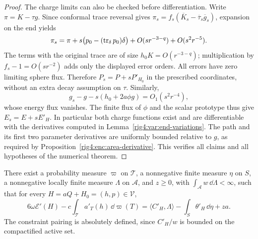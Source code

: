 \begin{proof}
The charge limits can also be checked before differentiation. Write
$\pi=K-\tau g$. Since conformal trace reversal gives
$\pi_s=f_s(\overline K_s-\overline\tau_s\overline g_s)$, expansion on the
end yields
\[
 \pi_s=\pi+s\bigl(p_0-(\operatorname{tr}_\delta p_0)\delta\bigr)
          +O(sr^{-3-q})+O(s^2r^{-5}).
\]
The terms with the original trace are of size
$h_0K=O(r^{-3-q})$; multiplication by $f_s-1=O(sr^{-2})$ adds only the
displayed error orders. All errors have zero limiting sphere flux.
Therefore $P_s=P+sP'_{H_0}$ in the prescribed coordinates, without an
extra decay assumption on $\tau$. Similarly,
\[
 g_s-g-s(h_0+2a\phi g)=O_1(s^2r^{-4}),
\]
whose energy flux vanishes. The finite flux of $\phi$ and the scalar
prototype thus give $E_s=E+sE'_H$. In particular both charge functions
exist and are differentiable with the derivatives computed in
Lemma~\ref{rig4:var:end-variations}. The path and its
first two parameter derivatives are uniformly bounded relative to $g$,
as required by Proposition~\ref{rig4:enc:area-derivative}. This verifies all
claims and all hypotheses of the numerical theorem.
\end{proof}

\begin{proposition}
\label{rig4:var:multiplier}
There exist a probability measure $\varpi$ on $\mathcal T$, a nonnegative
finite measure $\eta$ on $S$, a nonnegative locally finite measure
$\Lambda$ on $\mathcal A$, and $z\ge0$, with
$\int_{\mathcal A}w\,\dd\Lambda<\infty$, such that for every
$H=aQ+H_0=(h,p)\in\mathcal V$,
\begin{equation}
 6\omega\mathcal E'(H)-c\int_{\mathcal T}a'_T(h)\,\dd\varpi(T)
   =\langle C'_H,\Lambda\rangle
      -\int_S\theta'_H\,\dd\eta+za.
\label{rig4:var:measure-identity}
\end{equation}
The constraint pairing is absolutely defined, since $C'_H/w$ is bounded
on the compactified active set.
\end{proposition}

